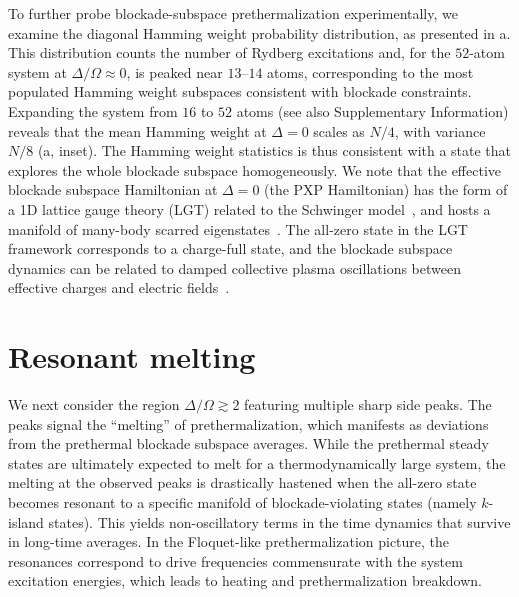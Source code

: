\documentclass[english,floatfix,twocolumn,showpacs, aps, prx, reprint, superscriptaddress, longbibliography]{revtex4-2}
\begin{document}
To further probe blockade-subspace prethermalization experimentally, we examine the diagonal Hamming weight probability distribution, as presented in a. This distribution counts the number of Rydberg excitations and, for the $52$-atom system at $\Delta/\Omega \approx 0$, is peaked near $13$--$14$ atoms, corresponding to the most populated Hamming weight subspaces consistent with blockade constraints. Expanding the system from $16$ to $52$ atoms (see also Supplementary Information) reveals that the mean Hamming weight at $\Delta = 0$ scales as $N/4$, with variance $N/8$ (a, inset). The Hamming weight statistics is thus consistent with a state that explores the whole blockade subspace homogeneously. We note that the effective blockade subspace Hamiltonian at $\Delta=0$ (the PXP Hamiltonian) has the form of a 1D lattice gauge theory (LGT) related to the Schwinger model~\cite{Surace:2020}, and hosts a manifold of many-body scarred eigenstates~\cite{Bernien:2017, Turner:2018}. The all-zero state in the LGT framework corresponds to a charge-full state, and the blockade subspace dynamics can be related to damped collective plasma oscillations between effective charges and electric fields~\cite{Mark:2025}.



\section*{Resonant melting}
\label{sec:melting}

We next consider the region $\Delta / \Omega \gtrsim 2$ featuring multiple sharp side peaks. The peaks signal the ``melting'' of prethermalization, which manifests as deviations from the prethermal blockade subspace averages. While the prethermal steady states are ultimately expected to melt for a thermodynamically large system, the melting at the observed peaks is drastically hastened when the all-zero state becomes resonant to a specific manifold of blockade-violating states (namely $k$-island states). This yields non-oscillatory terms in the time dynamics that survive in long-time averages. In the Floquet-like prethermalization picture, the resonances correspond to drive frequencies commensurate with the system excitation energies, which leads to heating and prethermalization breakdown.
\end{document}
